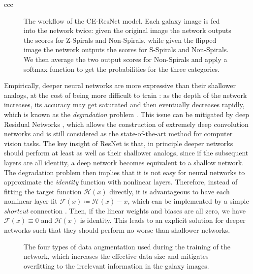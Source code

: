 \documentclass[twocolumn]{aastex631}
\begin{document}
\begin{deluxetable}{ccc}
\end{deluxetable}


\begin{figure}
    \caption{The workflow of the CE-ResNet model.
    Each galaxy image is fed into the network twice: given the original image the network outputs the scores for Z-Spirals and Non-Spirals, while given the flipped image the network outputs the scores for S-Spirals and Non-Spirals.
    We then average the two output scores for Non-Spirals and apply a softmax function to get the probabilities for the three categories.}
    \label{fig:arch}
\end{figure}


Empirically, deeper neural networks are more expressive than their shallower analogs, at the cost of being more difficult to train \citep{mhaskar2017when,mehta2019high}:
as the depth of the network increases, its accuracy may get saturated and then eventually decreases rapidly, which is known as the \textit{degradation} problem \citep{he2015convolutional,srivastava2015training}.
This issue can be mitigated by deep Residual Networks \citep[ResNet,][]{he2016deep}, which allows the construction of extremely deep convolution networks and is still considered as the state-of-the-art method for computer vision tasks.
The key insight of ResNet is that, in principle deeper networks should perform at least as well as their shallower analogs, since if the subsequent layers are all identity, a deep network becomes equivalent to a shallow network.
The degradation problem then implies that it is not easy for neural networks to approximate the \textit{identity} function with nonlinear layers.
Therefore, instead of fitting the target function $\mathcal{H}(x)$ directly, it is advantageous to have each nonlinear layer fit $\mathcal{F}(x) \coloneqq \mathcal{H}(x)-x$, which can be implemented by a simple \textit{shortcut} connection \citep[see e.g. Figure 2 of][]{he2016deep}.
Then, if the linear weights and biases are all zero, we have $\mathcal{F}(x)\equiv0$ and $\mathcal{H}(x)$ is identity.
This leads to an explicit solution for deeper networks such that they should perform no worse than shallower networks.


\begin{figure}
    \caption{The four types of data augmentation used during the training of the network, which increases the effective data size and mitigates overfitting to the irrelevant information in the galaxy images.}
    \label{fig:data-aug}
\end{figure}
\end{document}

